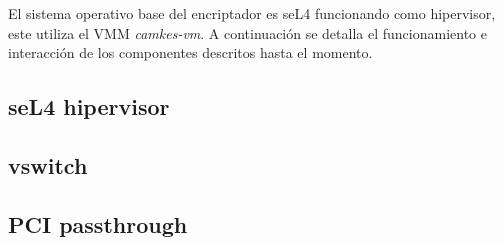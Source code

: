 El sistema operativo base del encriptador es seL4 funcionando como hipervisor, este utiliza el VMM \textit{camkes-vm}. A continuación se detalla el funcionamiento e interacción de los componentes descritos hasta el momento.

\subsection{seL4 hipervisor}

\subsection{vswitch}

\subsection{PCI passthrough}



\clearpage
